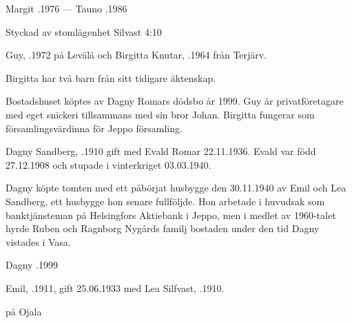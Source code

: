 Margit .1976  ---  Tauno .1986



Styckad av stomlägenhet Silvast 4:10


Guy, .1972 på Levälä och Birgitta Knutar, .1964 från Terjärv.
\begin{jhchildren}
  \item {}
\end{jhchildren}

Birgitta har två barn från sitt tidigare äktenskap.
\begin{jhchildren}
  \item {}
  \item {}
\end{jhchildren}
Bostadshuset köptes av Dagny Romars dödsbo år 1999. Guy är privatföretagare med eget snickeri tillsammans med sin bror Johan. Birgitta fungerar som församlingsvärdinna för Jeppo församling.


Dagny Sandberg, .1910 gift med Evald Romar 22.11.1936. Evald var född 27.12.1908 och stupade i vinterkriget 03.03.1940.
\begin{jhchildren}
  \item {}
  \item {}
\end{jhchildren}
Dagny köpte tomten med ett påbörjat husbygge den 30.11.1940 av Emil och Lea Sandberg, ett husbygge hon senare fullföljde. Hon arbetade i huvudsak som banktjänsteman på Helsingfors Aktiebank i Jeppo, men i medlet av 1960-talet hyrde Ruben och Ragnborg Nygårds familj bostaden under den tid Dagny vistades i Vasa.

Dagny .1999


Emil, .1911, gift 25.06.1933 med Lea Silfvast, .1910.
\begin{jhchildren}
  \item {}
  \item {}
  \item {} på Ojala
\end{jhchildren}

